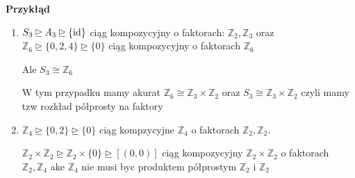 \textbf{Przykłąd} 
\begin{enumerate}[label=\arabic*)]
	\item $S_3 \unrhd A_3 \unrhd \{\operatorname{id} \} $ ciąg kompozycyjny o faktorach: $\mathbb{Z}_{2}, \mathbb{Z}_{3}$ oraz $\mathbb{Z}_{6} \unrhd \{0,2,4\} \unrhd \{0\}$ ciąg kompozycyjny o faktorach $\mathbb{Z} _{6}$ 

		Ale $S_3\cong \mathbb{Z}_{6}$ 

		W tym przypadku mamy akurat $\mathbb{Z} _{6}\cong \mathbb{Z} _{3}\times \mathbb{Z} _{2}$ oraz $S_3 \cong \mathbb{Z} _{3}\times \mathbb{Z} _{2}$ czyli mamy tzw rozkład półprosty na faktory
	\item $\mathbb{Z} _{4} \unrhd \{0,2\} \unrhd \{0\} $ ciąg kompzycyjne $\mathbb{Z}_{4}$ o faktorach $\mathbb{Z}_{2}, \mathbb{Z} _{2}$.

		$\mathbb{Z} _{2}\times \mathbb{Z} _{2}\unrhd \mathbb{Z} _{2} \times \{0\} \unrhd \left[ (0,0) \right]  $
		 ciąg kompozycyjny $\mathbb{Z}_{2}\times \mathbb{Z} _{2}$ o faktorach $\mathbb{Z} _{2},\mathbb{Z} _{4}$ 
		 ake $\mathbb{Z}_{4}$ nie musi byc produktem półprostym $\mathbb{Z}_{2} $ i $\mathbb{Z} _{2}$
\end{enumerate}

